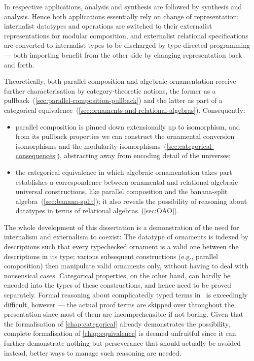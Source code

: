 In respective applications, analysis and synthesis are followed by synthesis and analysis.
Hence both applications essentially rely on change of representation: internalist datatypes and operations are switched to their externalist representations for modular composition, and externalist relational specifications are converted to internalist types to be discharged by type-directed programming --- both importing benefit from the other side by changing representation back and forth.

Theoretically, both parallel composition and algebraic ornamentation receive further characterisation by category-theoretic notions, the former as a pullback~(\autoref{sec:parallel-composition-pullback}) and the latter as part of a categorical equivalence~(\autoref{sec:ornaments-and-relational-algebras}).
Consequently:
\begin{itemize}
\item parallel composition is pinned down extensionally up to isomorphism, and from its pullback properties we can construct the ornamental conversion isomorphisms and the modularity isomorphisms~(\autoref{sec:categorical-consequences}), abstracting away from encoding detail of the universes;
\item the categorical equivalence in which algebraic ornamentation takes part establishes a correspondence between ornamental and relational algebraic universal constructions, like parallel composition and the banana-split algebra~(\autoref{sec:banana-split}); it also reveals the possibility of reasoning about datatypes in terms of relational algebras~(\autoref{sec:OAO}).
\end{itemize}
The whole development of this dissertation is a demonstration of the need for internalism and externalism to coexist: The datatype of ornaments is indexed by descriptions such that every typechecked ornament is a valid one between the descriptions in its type; various subsequent constructions (e.g., parallel composition) then manipulate valid ornaments only, without having to deal with nonsensical cases.
Categorical properties, on the other hand, can hardly be encoded into the types of these constructions, and hence need to be proved separately.
Formal reasoning about complicatedly typed terms in \Agda\ is exceedingly difficult, however --- the actual proof terms are skipped over throughout the presentation since most of them are incomprehensible if not boring.
Given that the formalisation of \autoref{chap:categorical} already demonstrates the possibility, complete formalisation of \autoref{chap:equivalence} is deemed unfruitful since it can further demonstrate nothing but perseverance that should actually be avoided --- instead, better ways to manage such reasoning are needed.

